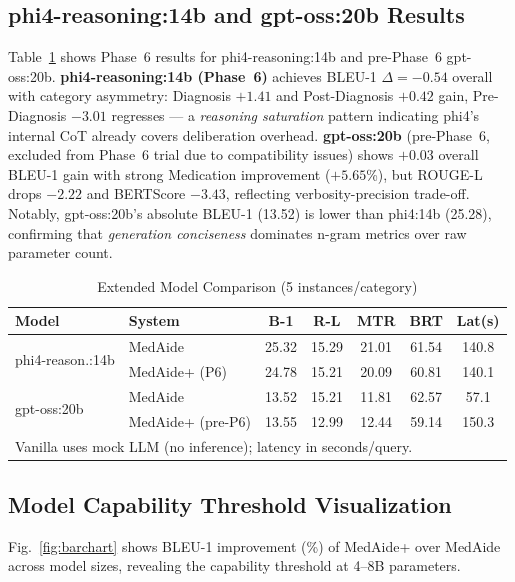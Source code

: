 \documentclass[conference]{IEEEtran}
\begin{document}
\subsection{phi4-reasoning:14b and gpt-oss:20b Results}

Table~\ref{tab:extended} shows Phase~6 results for phi4-reasoning:14b and pre-Phase~6 gpt-oss:20b. \textbf{phi4-reasoning:14b (Phase~6)} achieves BLEU-1 $\Delta=-0.54$ overall with category asymmetry: Diagnosis $+1.41$ and Post-Diagnosis $+0.42$ gain, Pre-Diagnosis $-3.01$ regresses — a \textit{reasoning saturation} pattern indicating phi4's internal CoT already covers deliberation overhead. \textbf{gpt-oss:20b} (pre-Phase~6, excluded from Phase~6 trial due to compatibility issues) shows $+0.03$ overall BLEU-1 gain with strong Medication improvement ($+5.65$\%), but ROUGE-L drops $-2.22$ and BERTScore $-3.43$, reflecting verbosity-precision trade-off. Notably, gpt-oss:20b's absolute BLEU-1 (13.52) is lower than phi4:14b (25.28), confirming that \textit{generation conciseness} dominates n-gram metrics over raw parameter count.

\begin{table}[t]
\centering
\caption{Extended Model Comparison (5 instances/category)}
\label{tab:extended}
\setlength{\tabcolsep}{3.5pt}
\begin{tabular}{llccccc}
\toprule
\textbf{Model} & \textbf{System} & \textbf{B-1} & \textbf{R-L} & \textbf{MTR} & \textbf{BRT} & \textbf{Lat(s)} \\
\midrule
\multirow{2}{*}{phi4-reason.:14b} & MedAide  & 25.32 & 15.29 & 21.01 & 61.54 & 140.8 \\
 & MedAide+ (P6)  & 24.78 & 15.21 & 20.09 & 60.81 & 140.1 \\
\midrule
\multirow{2}{*}{gpt-oss:20b} & MedAide  & 13.52 & 15.21 & 11.81 & 62.57 & 57.1 \\
 & MedAide+ (pre-P6)  & 13.55 & 12.99 & 12.44 & 59.14 & 150.3 \\
\bottomrule
\multicolumn{7}{l}{\scriptsize Vanilla uses mock LLM (no inference); latency in seconds/query.} \\
\end{tabular}
\end{table}

\subsection{Model Capability Threshold Visualization}

Fig.~\ref{fig:barchart} shows BLEU-1 improvement (\%) of MedAide+ over MedAide across model sizes, revealing the capability threshold at 4--8B parameters.
\end{document}
